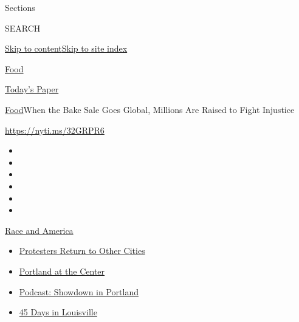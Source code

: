 Sections

SEARCH

\protect\hyperlink{site-content}{Skip to
content}\protect\hyperlink{site-index}{Skip to site index}

\href{https://www.nytimes3xbfgragh.onion/section/food}{Food}

\href{https://myaccount.nytimes3xbfgragh.onion/auth/login?response_type=cookie\&client_id=vi}{}

\href{https://www.nytimes3xbfgragh.onion/section/todayspaper}{Today's
Paper}

\href{/section/food}{Food}\textbar{}When the Bake Sale Goes Global,
Millions Are Raised to Fight Injustice

\url{https://nyti.ms/32GRPR6}

\begin{itemize}
\item
\item
\item
\item
\item
\item
\end{itemize}

\href{https://www.nytimes3xbfgragh.onion/news-event/george-floyd-protests-minneapolis-new-york-los-angeles?action=click\&pgtype=Article\&state=default\&region=TOP_BANNER\&context=storylines_menu}{Race
and America}

\begin{itemize}
\tightlist
\item
  \href{https://www.nytimes3xbfgragh.onion/2020/07/26/us/protests-portland-seattle-trump.html?action=click\&pgtype=Article\&state=default\&region=TOP_BANNER\&context=storylines_menu}{Protesters
  Return to Other Cities}
\item
  \href{https://www.nytimes3xbfgragh.onion/2020/07/24/us/portland-oregon-protests-white-race.html?action=click\&pgtype=Article\&state=default\&region=TOP_BANNER\&context=storylines_menu}{Portland
  at the Center}
\item
  \href{https://www.nytimes3xbfgragh.onion/2020/07/23/podcasts/the-daily/portland-protests.html?action=click\&pgtype=Article\&state=default\&region=TOP_BANNER\&context=storylines_menu}{Podcast:
  Showdown in Portland}
\item
  \href{https://www.nytimes3xbfgragh.onion/interactive/2020/07/16/us/black-lives-matter-protests-louisville-breonna-taylor.html?action=click\&pgtype=Article\&state=default\&region=TOP_BANNER\&context=storylines_menu}{45
  Days in Louisville}
\end{itemize}

